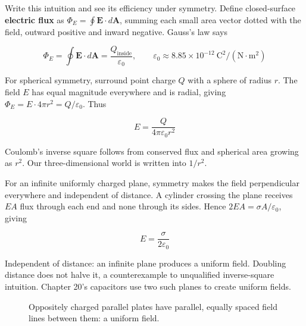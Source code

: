 \begin{mathbridge}
Write this intuition and see its efficiency under symmetry. Define closed-surface \textbf{electric flux} as \(\varPhi_E=\oint \mathbf E\cdot d\mathbf A\), summing each small area vector dotted with the field, outward positive and inward negative. Gauss's law says

\[ \varPhi_E=\oint \mathbf E\cdot d\mathbf A=\frac{Q_{\text{inside}}}{\varepsilon_0},\qquad \varepsilon_0\approx 8.85\times10^{-12}\ \mathrm{C^2/(N\cdot m^2)} \]

For spherical symmetry, surround point charge \(Q\) with a sphere of radius \(r\). The field \(E\) has equal magnitude everywhere and is radial, giving \(\varPhi_E = E\cdot 4\pi r^2 = Q/\varepsilon_0\). Thus

\[ E=\frac{Q}{4\pi\varepsilon_0 r^2} \]

Coulomb's inverse square follows from conserved flux and spherical area growing as \(r^2\). Our three-dimensional world is written into \(1/r^2\).

For an infinite uniformly charged plane, symmetry makes the field perpendicular everywhere and independent of distance. A cylinder crossing the plane receives \(EA\) flux through each end and none through its sides. Hence \(2EA=\sigma A/\varepsilon_0\), giving

\[ E=\frac{\sigma}{2\varepsilon_0} \]

Independent of distance: an infinite plane produces a uniform field. Doubling distance does not halve it, a counterexample to unqualified inverse-square intuition. Chapter 20's capacitors use two such planes to create uniform fields.
\end{mathbridge}

\begin{figure}[htbp]
\centering
{}
\caption{Oppositely charged parallel plates have parallel, equally spaced field lines between them: a uniform field.}
\end{figure}

